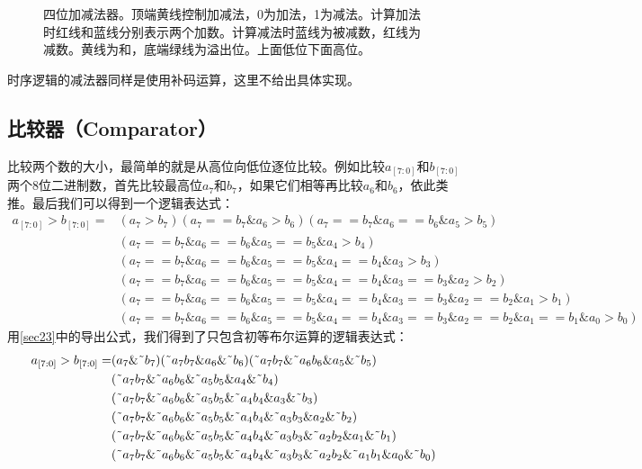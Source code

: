 \begin{figure}[!ht]
\centering
{}%
%
\caption{四位加减法器。顶端黄线控制加减法，0为加法，1为减法。计算加法时红线和蓝线分别表示两个加数。计算减法时蓝线为被减数，红线为减数。黄线为和，底端绿线为溢出位。上面低位下面高位。}\label{fig39}
\end{figure}

时序逻辑的减法器同样是使用补码运算，这里不给出具体实现。

\subsection{比较器（Comparator）}
比较两个数的大小，最简单的就是从高位向低位逐位比较。例如比较$a_{[7:0]}$和$b_{[7:0]}$两个8位二进制数，首先比较最高位$a_7$和$b_7$，如果它们相等再比较$a_6$和$b_6$，依此类推。最后我们可以得到一个逻辑表达式：
\[\begin{split}
a_{[7:0]}\mathtt{>}b_{[7:0]}=&(a_7\mathtt{>}b_7)(a_7\mathtt{==}b_7\& a_6\mathtt{>}b_6)(a_7\mathtt{==}b_7\& a_6\mathtt{==}b_6\& a_5\mathtt{>}b_5)\\
&(a_7\mathtt{==}b_7\& a_6\mathtt{==}b_6\& a_5\mathtt{==}b_5\& a_4\mathtt{>}b_4)\\
&(a_7\mathtt{==}b_7\& a_6\mathtt{==}b_6\& a_5\mathtt{==}b_5\& a_4\mathtt{==}b_4\& a_3\mathtt{>}b_3)\\
&(a_7\mathtt{==}b_7\& a_6\mathtt{==}b_6\& a_5\mathtt{==}b_5\& a_4\mathtt{==}b_4\& a_3\mathtt{==}b_3\& a_2\mathtt{>}b_2)\\
&(a_7\mathtt{==}b_7\& a_6\mathtt{==}b_6\& a_5\mathtt{==}b_5\& a_4\mathtt{==}b_4\& a_3\mathtt{==}b_3\& a_2\mathtt{==}b_2\& a_1\mathtt{>}b_1)\\
&(a_7\mathtt{==}b_7\& a_6\mathtt{==}b_6\& a_5\mathtt{==}b_5\& a_4\mathtt{==}b_4\& a_3\mathtt{==}b_3\& a_2\mathtt{==}b_2\& a_1\mathtt{==}b_1\& a_0\mathtt{>}b_0)
\end{split}\]
用\autoref{sec23}中的导出公式，我们得到了只包含初等布尔运算的逻辑表达式：
\[\begin{split}
a_{[7:0]}>b_{[7:0]}=&(a_7\&\textrm{\~{}}b_7)(\textrm{\~{}}a_7b_7\& a_6\&\textrm{\~{}}b_6)(\textrm{\~{}}a_7b_7\&\textrm{\~{}}a_6b_6\& a_5\&\textrm{\~{}}b_5)\\
					&(\textrm{\~{}}a_7b_7\&\textrm{\~{}}a_6b_6\&\textrm{\~{}}a_5b_5\& a_4\&\textrm{\~{}}b_4)\\
					&(\textrm{\~{}}a_7b_7\&\textrm{\~{}}a_6b_6\&\textrm{\~{}}a_5b_5\&\textrm{\~{}}a_4b_4\& a_3\&\textrm{\~{}}b_3)\\
					&(\textrm{\~{}}a_7b_7\&\textrm{\~{}}a_6b_6\&\textrm{\~{}}a_5b_5\&\textrm{\~{}}a_4b_4\&\textrm{\~{}}a_3b_3\& a_2\&\textrm{\~{}}b_2)\\
					&(\textrm{\~{}}a_7b_7\&\textrm{\~{}}a_6b_6\&\textrm{\~{}}a_5b_5\&\textrm{\~{}}a_4b_4\&\textrm{\~{}}a_3b_3\&\textrm{\~{}}a_2b_2\& a_1\&\textrm{\~{}}b_1)\\
					&(\textrm{\~{}}a_7b_7\&\textrm{\~{}}a_6b_6\&\textrm{\~{}}a_5b_5\&\textrm{\~{}}a_4b_4\&\textrm{\~{}}a_3b_3\&\textrm{\~{}}a_2b_2\&\textrm{\~{}}a_1b_1\& a_0\&\textrm{\~{}}b_0)
\end{split}\]

